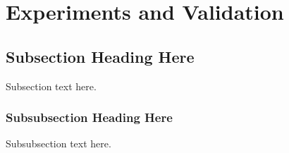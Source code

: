 \documentclass[journal]{IEEEtran}
\begin{document}
\section{Experiments and Validation}
\subsection{Subsection Heading Here}
Subsection text here.

\subsubsection{Subsubsection Heading Here}
Subsubsection text here.


%
%



%
%
\end{document}
